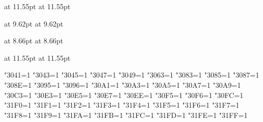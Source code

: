 {      %
      \jfont\secmc{\txijamcfont} at 11.55pt
      \jfont\secgt{\txijagtfont} at 11.55pt

      \jfont\ssecmc{\txijamcfont} at 9.62pt
      \jfont\ssecgt{\txijagtfont} at 9.62pt

      \jfont\reducedmc{\txijamcfont} at 8.66pt
      \jfont\reducedgt{\txijagtfont} at 8.66pt

      \jfont\shortcontmc{\txijamcfont} at 11.55pt
      \jfont\shortcontgt{\txijagtfont} at 11.55pt

    }

    \def\parseargusing#1#2{%
      \def\argtorun{#2}%
      \begingroup
        \ifx\ltjlineendcomment\thisisundefined
          \catcode"FFFFF=9
        \else
          \catcode\ltjlineendcomment=9
        \fi
        \obeylines
        \spaceisspace
        #1%
        \parseargline\empty%
    }
    \def\c{\begingroup \catcode`\^^M=\active%
      \ifx\ltjlineendcomment\thisisundefined
        \catcode"FFFFF=9%
      \else
        \catcode\ltjlineendcomment=9%
      \fi
    \catcode`\@=\other \catcode`\{=\other \catcode`\}=\other%
    \cxxx}
    \let\comment=\c
    \let\setfilename=\comment
    \let\dircategory=\comment
    \let\definfoenclose=\comment
    \let\footnotestyle=\comment
  \fi %

  \ifx\XeTeXrevision\thisisundefined
  \else
    \def\do#1{\XeTeXcharclass"#1=1 }
    \do{3041}\do{3043}\do{3045}\do{3047}\do{3049}\do{3063}
    \do{3083}\do{3085}\do{3087}\do{308E}\do{3095}\do{3096}
    \do{30A1}\do{30A3}\do{30A5}\do{30A7}\do{30A9}\do{30C3}
    \do{30E3}\do{30E5}\do{30E7}\do{30EE}\do{30F5}\do{30F6}
    \do{30FC}\do{31F0}\do{31F1}\do{31F2}\do{31F3}\do{31F4}
    \do{31F5}\do{31F6}\do{31F7}\do{31F8}\do{31F9}\do{31FA}
    \do{31FB}\do{31FC}\do{31FD}\do{31FE}\do{31FF}

